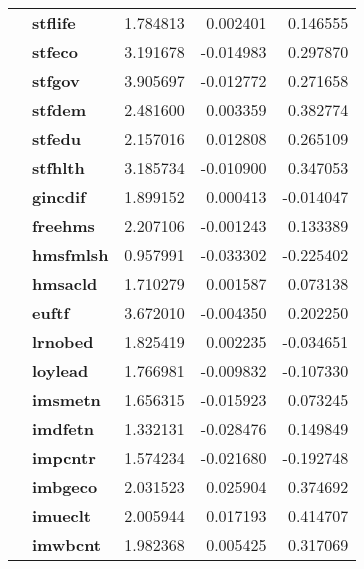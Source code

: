 \begin{table}[H]
\begin{tabular}{llrrr}
\textbf{} & \textbf{stflife} & 1.784813 & 0.002401 & 0.146555 \\
\textbf{} & \textbf{stfeco} & 3.191678 & -0.014983 & 0.297870 \\
\textbf{} & \textbf{stfgov} & 3.905697 & -0.012772 & 0.271658 \\
\textbf{} & \textbf{stfdem} & 2.481600 & 0.003359 & 0.382774 \\
\textbf{} & \textbf{stfedu} & 2.157016 & 0.012808 & 0.265109 \\
\textbf{} & \textbf{stfhlth} & 3.185734 & -0.010900 & 0.347053 \\
\textbf{} & \textbf{gincdif} & 1.899152 & 0.000413 & -0.014047 \\
\textbf{} & \textbf{freehms} & 2.207106 & -0.001243 & 0.133389 \\
\textbf{} & \textbf{hmsfmlsh} & 0.957991 & -0.033302 & -0.225402 \\
\textbf{} & \textbf{hmsacld} & 1.710279 & 0.001587 & 0.073138 \\
\textbf{} & \textbf{euftf} & 3.672010 & -0.004350 & 0.202250 \\
\textbf{} & \textbf{lrnobed} & 1.825419 & 0.002235 & -0.034651 \\
\textbf{} & \textbf{loylead} & 1.766981 & -0.009832 & -0.107330 \\
\textbf{} & \textbf{imsmetn} & 1.656315 & -0.015923 & 0.073245 \\
\textbf{} & \textbf{imdfetn} & 1.332131 & -0.028476 & 0.149849 \\
\textbf{} & \textbf{impcntr} & 1.574234 & -0.021680 & -0.192748 \\
\textbf{} & \textbf{imbgeco} & 2.031523 & 0.025904 & 0.374692 \\
\textbf{} & \textbf{imueclt} & 2.005944 & 0.017193 & 0.414707 \\
\textbf{} & \textbf{imwbcnt} & 1.982368 & 0.005425 & 0.317069 \\
\cline{1-5}
\bottomrule
\end{tabular}
\end{table}
